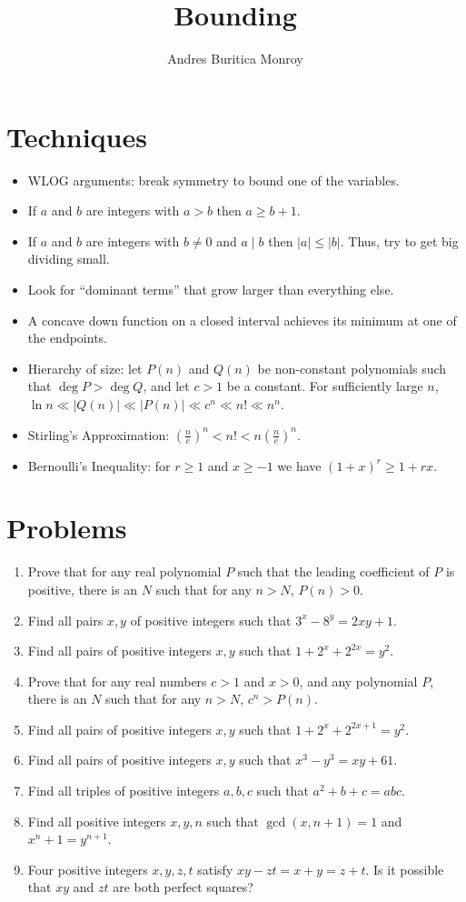\documentclass{article}
\title{Bounding}
\author{Andres Buritica Monroy}
\date{}
\begin{document}
\maketitle
\section{Techniques}
\begin{itemize}
	\item WLOG arguments: break symmetry to bound one of the variables.
	\item If $a$ and $b$ are integers with $a>b$ then $a\ge b+1$.
	\item If $a$ and $b$ are integers with $b\ne 0$ and $a\mid b$ then
	      $|a|\le|b|$. Thus, try to get big dividing small.
	\item Look for ``dominant terms'' that grow larger than everything else.
	\item A concave down function on a closed interval
	      achieves its minimum at one of the endpoints.
	\item Hierarchy of size: let $P(n)$ and $Q(n)$ be non-constant polynomials such that $\deg
		      P>\deg Q$, and let $c>1$ be a constant. For sufficiently large $n$,
	      $\ln n\ll|Q(n)|\ll|P(n)|\ll c^n\ll n!\ll n^n$.
	\item Stirling's Approximation: $\left(\frac ne\right)^n<n!<n\left(\frac
		      ne\right)^n$.
	\item Bernoulli's Inequality: for $r\ge 1$ and $x\ge -1$ we have $(1+x)^r\ge
		      1+rx$.
\end{itemize}
\section{Problems}
\begin{enumerate}
	\item Prove that for any real polynomial $P$ such that the leading coefficient
	      of $P$ is positive, there is an $N$ such that for any $n>N$, $P(n)>0$.
	\item Find all pairs $x,y$ of positive integers such that $3^x-8^y=2xy+1$.
	\item Find all pairs of positive integers $x,y$ such that
	      $1+2^x+2^{2x}=y^2$.
	\item Prove that for any real numbers $c>1$ and $x>0$, and any polynomial $P$,
	      there is an $N$ such that for any $n>N$, $c^n>P(n)$.
	\item Find all pairs of positive integers $x,y$ such that
	      $1+2^x+2^{2x+1}=y^2$.
	\item Find all pairs of positive integers $x,y$ such that $x^3-y^3=xy+61$.
	\item Find all triples of positive integers $a,b,c$ such that $a^2+b+c=abc$.
	\item Find all positive integers $x,y,n$ such that $\gcd(x,n+1)=1$ and
	      $x^n+1=y^{n+1}$.
	\item Four positive integers $x,y,z,t$ satisfy $xy-zt=x+y=z+t$. Is it possible
	      that $xy$ and $zt$ are both perfect squares?
\end{enumerate}
\newpage
\end{document}
